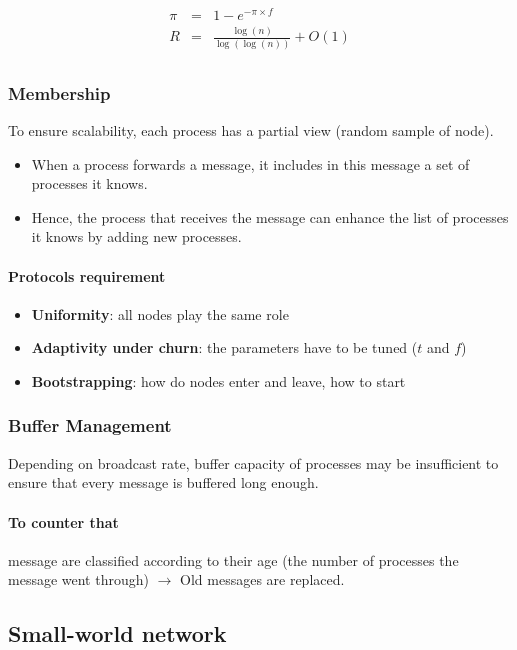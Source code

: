 \begin{eqnarray*}
\pi &=& 1-e^{-\pi \times f}\\
R &=& \frac{\log(n)}{\log(\log(n))}+O(1)\\
\end{eqnarray*}

\subsubsection{Membership}

To ensure scalability, each process has a partial view (random sample of
node).

\begin{itemize}
	\item When a process forwards a message, it
	includes in this message a set of processes it knows.
	\item Hence, the process that receives the message can enhance the
	list of processes it knows by adding new processes.
\end{itemize}

\paragraph{Protocols requirement}

\begin{itemize}
\item \textbf{Uniformity}: all nodes play the same role
\item \textbf{Adaptivity under churn}: the parameters have to be tuned ($t$ and $f$)
\item \textbf{Bootstrapping}: how do nodes enter and leave, how to start
\end{itemize}


\subsubsection{Buffer Management}

Depending on broadcast rate, buffer capacity of processes may be
insufficient to ensure that every message is buffered long enough.

\paragraph{To counter that}
message are classified according to their
age (the number of processes the message went through) $\to$
Old messages are replaced.

\subsection{Small-world network}

